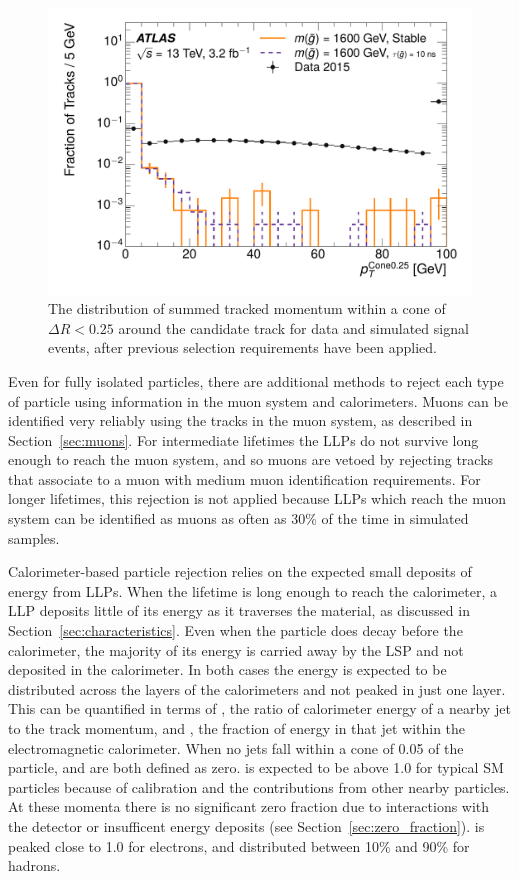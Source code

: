 \begin{figure}[h]
\centering
\includegraphics[width=\fullfig]{figures/selection_isopt_nm1.pdf}
\caption{The distribution of summed tracked momentum within a cone of $\Delta R < 0.25$ around the candidate track for data and simulated signal events, after previous selection requirements have been applied.}
\label{fig:nm1_isopt}
\end{figure}

Even for fully isolated particles, there are additional methods to reject each type of particle using information in the muon system and calorimeters.
Muons can be identified very reliably using the tracks in the muon system, as described in Section~\ref{sec:muons}.
For intermediate lifetimes the \acp{LLP} do not survive long enough to reach the muon system, and so muons are vetoed by rejecting tracks that associate to a muon with medium muon identification requirements.
For longer lifetimes, this rejection is not applied because \acp{LLP} which reach the muon system can be identified as muons as often as 30\% of the time in simulated samples.

Calorimeter-based particle rejection relies on the expected small deposits of energy from \acp{LLP}. 
When the lifetime is long enough to reach the calorimeter, a \ac{LLP} deposits little of its energy as it traverses the material, as discussed in Section~\ref{sec:characteristics}. 
Even when the particle does decay before the calorimeter, the majority of its energy is carried away by the \ac{LSP} and not deposited in the calorimeter.
In both cases the energy is expected to be distributed across the layers of the calorimeters and not peaked in just one layer. 
This can be quantified in terms of \ep, the ratio of calorimeter energy of a nearby jet to the track momentum, and \emfrac, the fraction of energy in that jet within the electromagnetic calorimeter.
When no jets fall within a cone of 0.05 of the particle, \ep and \emfrac are both defined as zero.
\ep is expected to be above 1.0 for typical \ac{SM} particles because of calibration and the contributions from other nearby particles.
At these momenta there is no significant zero fraction due to interactions with the detector or insufficent energy deposits (see Section~\ref{sec:zero_fraction}). 
\emfrac is peaked close to 1.0 for electrons, and distributed between 10\% and 90\% for hadrons.

